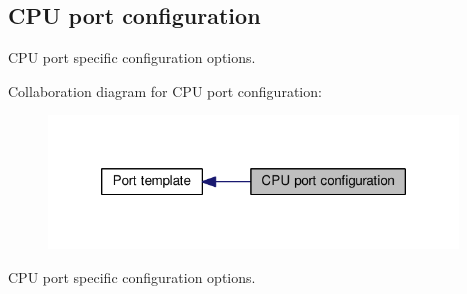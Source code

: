 \hypertarget{group__template__cpu__cfg}{\subsection{C\-P\-U port configuration}
\label{group__template__cpu__cfg}
}


C\-P\-U port specific configuration options.  


Collaboration diagram for C\-P\-U port configuration\-:\nopagebreak
\begin{figure}[H]
\begin{center}
\leavevmode
\includegraphics[width=308pt]{group__template__cpu__cfg}
\end{center}
\end{figure}
C\-P\-U port specific configuration options. 